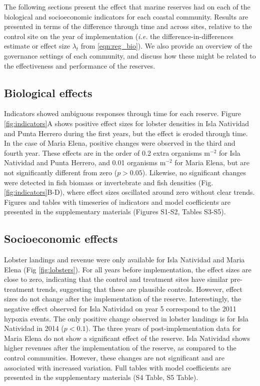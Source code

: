 \documentclass{frontiersSCNS}
\begin{document}
The following sections present the effect that marine reserves had on
each of the biological and socioeconomic indicators for each coastal
community. Results are presented in terms of the difference through time
and across sites, relative to the control site on the year of
implementation (\emph{i.e.} the difference-in-differences estimate or
effect size \(\lambda_t\) from \ref{eqn:reg_bio}). We also provide an
overview of the governance settings of each community, and discuss how
these might be related to the effectiveness and performance of the
reserves.

\hypertarget{biological-effects}{%
\subsection{Biological effects}\label{biological-effects}}

Indicators showed ambiguous responses through time for each reserve.
Figure \ref{fig:indicators}A shows positive effect sizes for lobster
densities in Isla Natividad and Punta Herrero during the first years,
but the effect is eroded through time. In the case of Maria Elena,
positive changes were observed in the third and fourth year. These
effects are in the order of 0.2 extra organisms \(\mathrm{m}^{-2}\) for
Isla Natividad and Punta Herrero, and 0.01 organisms \(\mathrm{m}^{-2}\)
for Maria Elena, but are not significantly different from zero
(\(p > 0.05\)). Likewise, no significant changes were detected in fish
biomass or invertebrate and fish densities (Fig.
\ref{fig:indicators}B-D), where effect sizes oscillated around zero
without clear trends. Figures and tables with timeseries of indicators
and model coefficients are presented in the supplementary materials
(Figures S1-S2, Tables S3-S5).

\hypertarget{socioeconomic-effects}{%
\subsection{Socioeconomic effects}\label{socioeconomic-effects}}

Lobster landings and revenue were only available for Isla Natividad and
Maria Elena (Fig \ref{fig:lobsters}). For all years before
implementation, the effect sizes are close to zero, indicating that the
control and treatment sites have similar pre-treatment trends,
suggesting that these are plausible controls. However, effect sizes do
not change after the implementation of the reserve. Interestingly, the
negative effect observed for Isla Natividad on year 5 correspond to the
2011 hypoxia events. The only positive change observed in lobster
landings is for Isla Natividad in 2014 (\(p < 0.1\)). The three years of
post-implementation data for Maria Elena do not show a significant
effect of the reserve. Isla Natividad shows higher revenues after the
implementation of the reserve, as compared to the control communities.
However, these changes are not significant and are associated with
increased variation. Full tables with model coefficients are presented
in the supplementary materials (S4 Table, S5 Table).
\end{document}
